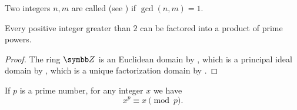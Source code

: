 \begin{definition}\label{def:coprime_numbers}
  Two integers \( n, m \) are called  (see ) if \( \gcd(n, m) = 1 \).
\end{definition}

\begin{theorem}\label{thm:fundamental_theorem_of_arithmetic}
  Every positive integer greater than \( 2 \) can be factored into a product of prime powers.
\end{theorem}
\begin{proof}
  The ring \( \BZ \) is an Euclidean domain by , which is a principal ideal domain by , which is a unique factorization domain by .
\end{proof}

\begin{proposition}\label{thm:fermats_little_theorem}
  If \( p \) is a prime number, for any integer \( x \) we have
  \begin{equation*}
    x^p \equiv x \pmod p.
  \end{equation*}
\end{proposition}
